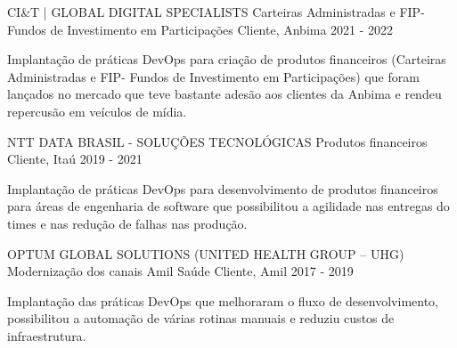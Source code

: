

\begin{cventries}

  \cventry
    {CI\&T | GLOBAL DIGITAL SPECIALISTS} %
    {Carteiras Administradas e FIP-Fundos de Investimento em Participações} %
    {Cliente, Anbima} %
    {2021 - 2022} %
    {
      \begin{cvitems} %
        \item {Implantação de práticas DevOps para criação de produtos financeiros (Carteiras Administradas e FIP- Fundos de Investimento em Participações) que foram lançados no mercado que teve bastante adesão aos clientes da Anbima e rendeu repercusão em veículos de mídia.}
      \end{cvitems}
    }

  \cventry
    {NTT DATA BRASIL - SOLUÇÕES TECNOLÓGICAS} %
    {Produtos financeiros} %
    {Cliente, Itaú} %
    {2019 - 2021} %
    {
      \begin{cvitems} %
        \item {Implantação de práticas DevOps para desenvolvimento de produtos financeiros para áreas de engenharia de software que possibilitou a agilidade nas entregas do times e nas redução de falhas nas produção.}
      \end{cvitems}
    }

  \cventry
    {OPTUM GLOBAL SOLUTIONS (UNITED HEALTH GROUP – UHG)} %
    {Modernização dos canais Amil Saúde} %
    {Cliente, Amil} %
    {2017 - 2019} %
    {
      \begin{cvitems} %
        \item {Implantação das práticas DevOps que melhoraram o fluxo de desenvolvimento, possibilitou a automação de várias rotinas manuais e reduziu custos de infraestrutura.}
      \end{cvitems}
}

\end{cventries}
